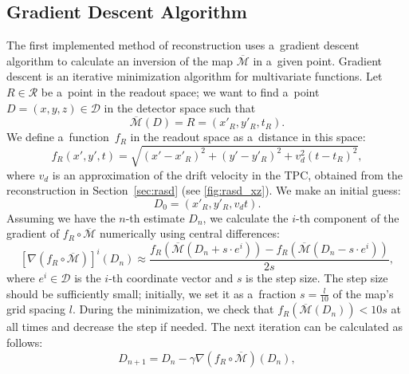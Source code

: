 		
		\subsection{Gradient Descent Algorithm}
		\label{sec:grad}			
			The first implemented method of reconstruction uses a~gradient descent algorithm to calculate an inversion of the map $\overline{\mathcal{M}}$ in a~given point. Gradient descent is an iterative minimization algorithm for multivariate functions. Let $R\in\mathcal{R}$ be a~point in the readout space; we want to find a~point $D = (x,y,z) \in\mathcal{D}$ in the detector space such that 
				\begin{equation}
					\overline{\mathcal{M}}(D) = R = (x'_R,y'_R,t_R).
				\end{equation}
			We define a~function~$f_R$ in the readout space as a~distance in this space:
				\begin{equation}
					f_R(x',y',t) = \sqrt{(x'-x'_R)^2+(y'-y'_R)^2+v_d^2(t-t_R)^2},
				\end{equation}
			where $v_d$ is an approximation of the drift velocity in the \ac{TPC}, obtained from the reconstruction in Section~\ref{sec:rasd} (see \cref{fig:rasd_xz}). We make an initial guess:
				\begin{equation}
					D_0 = (x'_R,y'_R,v_dt).
				\end{equation}
			Assuming we have the $n$-th estimate $D_n$, we calculate the $i$-th component of the gradient of $f_R\circ\overline{\mathcal{M}}$ numerically using central differences:
				\begin{equation}
					\left[\nabla(f_R\circ\overline{\mathcal{M}})\right]^i(D_n) \approx \frac{f_R(\overline{\mathcal{M}}(D_n+s\cdot e^i))-f_R(\overline{\mathcal{M}}(D_n-s\cdot e^i))}{2s},
				\end{equation}
			where $e^i\in\mathcal{D}$ is the $i$-th coordinate vector and $s$ is the step size. The step size should be sufficiently small; initially, we set it as a~fraction $s = \frac{l}{10}$ of the map's grid spacing $l$. During the minimization, we check that $f_R(\overline{\mathcal{M}}(D_n))<10s$ at all times and decrease the step if needed. The next iteration can be calculated as follows:
				\begin{equation}
					D_{n+1} = D_n - \gamma \nabla(f_R\circ\overline{\mathcal{M}})(D_n),
				\end{equation}
